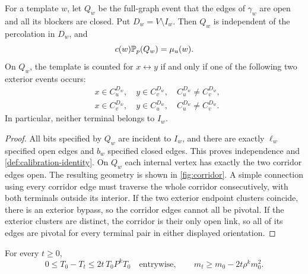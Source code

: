 \begin{lemma}\label{def:calibration}
For a template $w$, let $Q_w$ be the full-graph event that the edges of
$\gamma_w$ are open and all its blockers are closed.  Put
$D_w=V\setminus I_w$.  Then $Q_w$ is independent of the percolation in
$D_w$, and
\begin{equation}\label{def:calibration-identity}
 c(w)\mathbb P_p(Q_w)=\mu_u(w).
\end{equation}
On $Q_w$, the template is counted for $x\leftrightarrow y$ if and only if
one of the following two exterior events occurs:
\[
 \begin{split}
 &x\in C_u^{D_w},\quad y\in C_v^{D_w},\quad
                C_u^{D_w}\ne C_v^{D_w},\\
 &x\in C_v^{D_w},\quad y\in C_u^{D_w},\quad
                C_u^{D_w}\ne C_v^{D_w}.
 \end{split}
\]
In particular, neither terminal belongs to $I_w$.
\end{lemma}

\begin{proof}
All bits specified by $Q_w$ are incident to $I_w$, and there are exactly
$\ell_w$ specified open edges and $b_w$ specified closed edges.  This proves
independence and \eqref{def:calibration-identity}.
On $Q_w$ each internal vertex has exactly the two corridor edges open.
The resulting geometry is shown in \cref{fig:corridor}.
A simple connection using every corridor edge must traverse the whole
corridor consecutively, with both terminals outside its interior.  If the
two exterior endpoint clusters coincide, there is an exterior bypass, so
the corridor edges cannot all be pivotal.  If the exterior clusters are
distinct, the corridor is their only open link, so all of its edges are
pivotal for every terminal pair in either displayed orientation.
\end{proof}



\begin{proposition}\label{def:norm}
For every $t\ge0$,
\begin{equation}\label{eq:s27}
 0\le T_0-T_t\le 2t\,T_0P^kT_0\quad\text{entrywise},\qquad
 m_t\ge m_0-2t\rho^km_0^2.
\end{equation}
\end{proposition}

